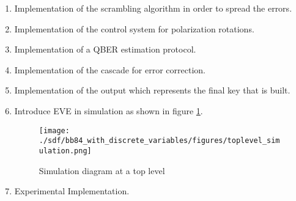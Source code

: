 \begin{refsection}
\begin{enumerate}
    \item Implementation of the scrambling algorithm in order to spread the errors.
    \item Implementation of the control system for polarization rotations.
    \item Implementation of a QBER estimation protocol.
    \item Implementation of the cascade for error correction.
    \item Implementation of the output which represents the final key that is built.
    \item Introduce EVE in simulation as shown in figure \ref{toplevelsimulation2}.
        \begin{figure}[H]
        	\centering
        	\texttt{[image: ./sdf/bb84\_with\_discrete\_variables/figures/toplevel\_simulation.png]}
        	\caption{Simulation diagram at a top level}\label{toplevelsimulation2}
        \end{figure}
    \item Experimental Implementation.
\end{enumerate}
  


\newpage


%
%	
%	
%	
%	

\clearpage
\printbibliography[heading=subbibliography]
\end{refsection}
\cleardoublepage
